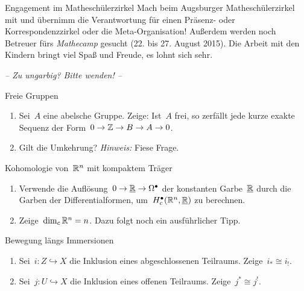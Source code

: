 \documentclass{uebblatt}
\begin{document}
\begin{aufgabe}{Engagement im Matheschülerzirkel}
Mach beim Augsburger Matheschülerzirkel mit und übernimm die Verantwortung für
einen Präsenz- oder Korrespondenzzirkel oder die Meta-Organisation!
Außerdem werden noch Betreuer fürs \emph{Mathecamp} gesucht (22. bis 27. August
2015). Die Arbeit mit den Kindern bringt viel Spaß und Freude, es lohnt sich sehr.
\end{aufgabe}

\begin{center}\emph{-- Zu ungarbig? Bitte wenden! --}
\end{center}

\newpage

\begin{aufgabe}{Freie Gruppen}
\begin{enumerate}
\item Sei~$A$ eine abelsche Gruppe. Zeige: Ist~$A$ frei, so zerfällt jede kurze
exakte Sequenz der Form~$0 \to \mathbb{Z} \to B \to A \to 0$.
\item Gilt die Umkehrung? {\tiny\emph{Hinweis:} Fiese Frage.}
\end{enumerate}
\end{aufgabe}

\begin{aufgabe}{Kohomologie von~$\mathbb{R}^n$ mit kompaktem Träger}
\begin{enumerate}
\item Verwende die Auflösung~$0 \to \underline{\mathbb{R}} \to \Omega^\bullet$ der konstanten
Garbe~$\underline{\mathbb{R}}$ durch die Garben der Differentialformen,
um~$H_c^\bullet(\mathbb{R}^n,\underline{\mathbb{R}})$ zu berechnen.
\item Zeige~$\dim_c \mathbb{R}^n = n$. {\tiny Dazu folgt noch ein ausführlicher Tipp.}
\end{enumerate}
\end{aufgabe}

\begin{aufgabe}{Bewegung längs Immersionen}
\begin{enumerate}
\item Sei~$i : Z \hookrightarrow X$ die Inklusion eines abgeschlossenen
Teilraums. Zeige~$i_* \cong i_!$.
\item Sei~$j : U \hookrightarrow X$ die Inklusion eines offenen Teilraums.
Zeige~$j^* \cong j^!$.
\end{enumerate}
\end{aufgabe}
\end{document}
